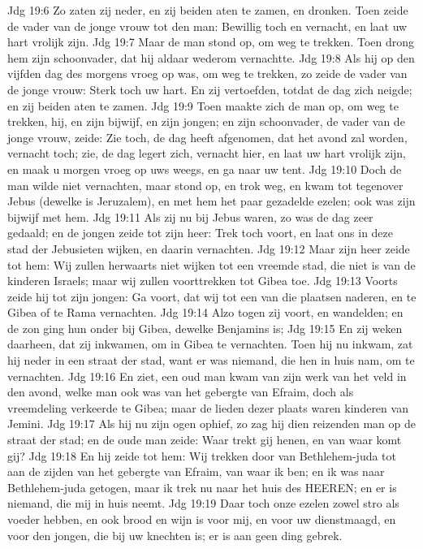 Jdg 19:6  Zo zaten zij neder, en zij beiden aten te zamen, en dronken. Toen zeide de vader van de jonge vrouw tot den man: Bewillig toch en vernacht, en laat uw hart vrolijk zijn.
Jdg 19:7  Maar de man stond op, om weg te trekken. Toen drong hem zijn schoonvader, dat hij aldaar wederom vernachtte.
Jdg 19:8  Als hij op den vijfden dag des morgens vroeg op was, om weg te trekken, zo zeide de vader van de jonge vrouw: Sterk toch uw hart. En zij vertoefden, totdat de dag zich neigde; en zij beiden aten te zamen.
Jdg 19:9  Toen maakte zich de man op, om weg te trekken, hij, en zijn bijwijf, en zijn jongen; en zijn schoonvader, de vader van de jonge vrouw, zeide: Zie toch, de dag heeft afgenomen, dat het avond zal worden, vernacht toch; zie, de dag legert zich, vernacht hier, en laat uw hart vrolijk zijn, en maak u morgen vroeg op uws weegs, en ga naar uw tent.
Jdg 19:10  Doch de man wilde niet vernachten, maar stond op, en trok weg, en kwam tot tegenover Jebus (dewelke is Jeruzalem), en met hem het paar gezadelde ezelen; ook was zijn bijwijf met hem.
Jdg 19:11  Als zij nu bij Jebus waren, zo was de dag zeer gedaald; en de jongen zeide tot zijn heer: Trek toch voort, en laat ons in deze stad der Jebusieten wijken, en daarin vernachten.
Jdg 19:12  Maar zijn heer zeide tot hem: Wij zullen herwaarts niet wijken tot een vreemde stad, die niet is van de kinderen Israels; maar wij zullen voorttrekken tot Gibea toe.
Jdg 19:13  Voorts zeide hij tot zijn jongen: Ga voort, dat wij tot een van die plaatsen naderen, en te Gibea of te Rama vernachten.
Jdg 19:14  Alzo togen zij voort, en wandelden; en de zon ging hun onder bij Gibea, dewelke Benjamins is;
Jdg 19:15  En zij weken daarheen, dat zij inkwamen, om in Gibea te vernachten. Toen hij nu inkwam, zat hij neder in een straat der stad, want er was niemand, die hen in huis nam, om te vernachten.
Jdg 19:16  En ziet, een oud man kwam van zijn werk van het veld in den avond, welke man ook was van het gebergte van Efraim, doch als vreemdeling verkeerde te Gibea; maar de lieden dezer plaats waren kinderen van Jemini.
Jdg 19:17  Als hij nu zijn ogen ophief, zo zag hij dien reizenden man op de straat der stad; en de oude man zeide: Waar trekt gij henen, en van waar komt gij?
Jdg 19:18  En hij zeide tot hem: Wij trekken door van Bethlehem-juda tot aan de zijden van het gebergte van Efraim, van waar ik ben; en ik was naar Bethlehem-juda getogen, maar ik trek nu naar het huis des HEEREN; en er is niemand, die mij in huis neemt.
Jdg 19:19  Daar toch onze ezelen zowel stro als voeder hebben, en ook brood en wijn is voor mij, en voor uw dienstmaagd, en voor den jongen, die bij uw knechten is; er is aan geen ding gebrek.
